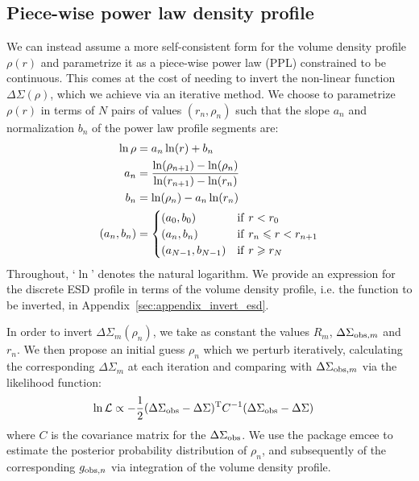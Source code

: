 \documentclass[usenatbib]{mnras}
\newcommand{\un}[1]{_{\rm #1}}
\begin{document}
\subsection{Piece-wise power law density profile}
\label{sec:piece-wise_powerlaw}

We can instead assume a more self-consistent form for the volume density profile $\rho(r)$ and parametrize it as a piece-wise power law (PPL) constrained to be continuous. This comes at the cost of needing to invert the non-linear function $\Delta\Sigma(\rho)$, which we achieve via an iterative method. We choose to parametrize $\rho(r)$ in terms of $N$ pairs of values $(r_n,\rho_n)$ such that the slope $a_n$ and normalization $b_n$ of the power law profile segments are:
\begin{align}
\ln\rho &= a_n \ln(r) + b_n \\
a_n &= \frac{\ln(\rho_{n+1})-\ln(\rho_n)}{\ln(r_{n+1})-\ln(r_n)}\\
b_n &= \ln(\rho_n) - a_n\ln(r_n)\\
(a_n, b_n) &=
\begin{cases}
(a_0, b_0) & {\rm if}\ r < r_0\\
(a_n, b_n) & {\rm if}\ r_n \leq r < r_{n+1}\\
(a_{N-1}, b_{N-1}) & {\rm if}\ r \geq r_N
\end{cases}
\label{eq:rho_piecewise_powerlaw}\end{align}
Throughout, `$\ln$' denotes the natural logarithm. We provide an expression for the discrete ESD profile in terms of the volume density profile, i.e. the function to be inverted, in Appendix~\ref{sec:appendix_invert_esd}.

In order to invert $\Delta\Sigma_m(\rho_n)$, we take as constant the values $R_m$, $\Delta\Sigma_{{\rm obs},m}$ and $r_{n}$. We then propose an initial guess $\rho_n$ which we perturb iteratively, calculating the corresponding $\Delta\Sigma_m$ at each iteration and comparing with $\Delta\Sigma_{{\rm obs},m}$ via the likelihood function:
\begin{align}
\ln\mathcal{L} &\propto -\frac{1}{2}(\Delta\Sigma\un{obs}-\Delta\Sigma)^{\rm T}C^{-1}(\Delta\Sigma\un{obs}-\Delta\Sigma)
\end{align}
where $C$ is the covariance matrix for the $\Delta\Sigma\un{obs}$. We use the package {\sc emcee} \citep{foreman-mackey13} to estimate the posterior probability distribution of $\rho_n$, and subsequently of the corresponding $g_{{\rm obs},n}$ via integration of the volume density profile.
\end{document}
